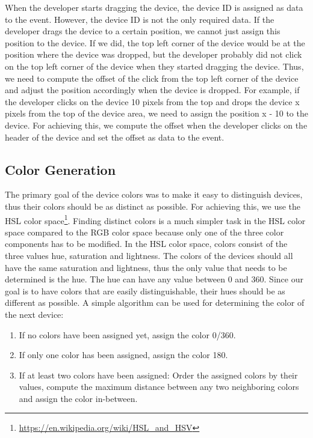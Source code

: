 When the developer starts dragging the device, the device ID is assigned as data to the event. However, the device ID is not the only required data. If the developer drags the device to a certain position, we cannot just assign this position to the device. If we did, the top left corner of the device would be at the position where the device was dropped, but the developer probably did not click on the top left corner of the device when they started dragging the device. Thus, we need to compute the offset of the click from the top left corner of the device and adjust the position accordingly when the device is dropped. For example, if the developer clicks on the device 10 pixels from the top and drops the device x pixels from the top of the device area, we need to assign the position x - 10 to the device. For achieving this, we compute the offset when the developer clicks on the header of the device and set the offset as data to the event.

\subsection{Color Generation}

The primary goal of the device colors was to make it easy to distinguish devices, thus their colors should be as distinct as possible. For achieving this, we use the HSL color space\footnote{\url{https://en.wikipedia.org/wiki/HSL_and_HSV}}. Finding distinct colors is a much simpler task in the HSL color space compared to the RGB color space because only one of the three color components has to be modified. In the HSL color space, colors consist of the three values hue, saturation and lightness. The colors of the devices should all have the same saturation and lightness, thus the only value that needs to be determined is the hue. The hue can have any value between 0 and 360. Since our goal is to have colors that are easily distinguishable, their hues should be as different as possible. A simple algorithm can be used for determining the color of the next device:
\begin{enumerate}
	\item If no colors have been assigned yet, assign the color 0/360.
	\item If only one color has been assigned, assign the color 180.
	\item If at least two colors have been assigned: Order the assigned colors by their values, compute the maximum distance between any two neighboring colors and assign the color in-between.
\end{enumerate}

